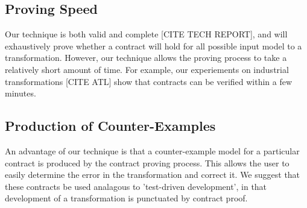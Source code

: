 \subsection{Proving Speed}

Our technique is both valid and complete [CITE TECH REPORT], and will exhaustively prove whether a contract will hold for all possible input model to a transformation. However, our technique allows the proving process to take a relatively short amount of time. For example, our experiements on industrial transformations [CITE ATL] show that contracts can be verified within a few minutes. 

\subsection{Production of Counter-Examples}

An advantage of our technique is that a counter-example model for a particular contract is produced by the contract proving process. This allows the user to easily determine the error in the transformation and correct it. We suggest that these contracts be used analagous to 'test-driven development', in that development of a transformation is punctuated by contract proof.

 